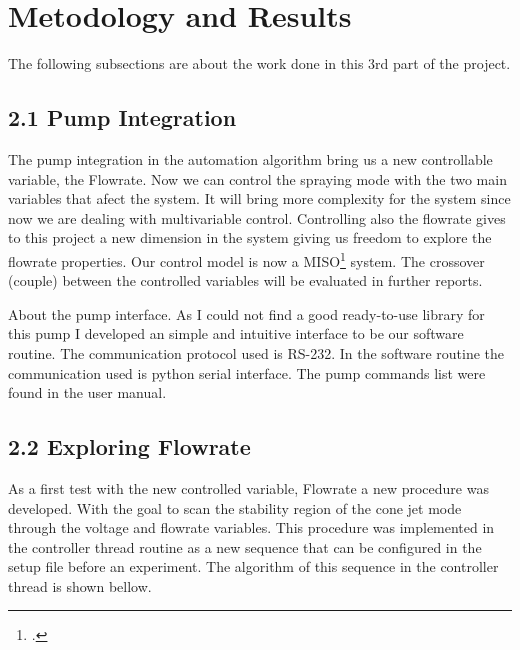 \section{Metodology and Results}

    The following subsections are about the work done in this 3rd part of the project.


\subsection*{2.1 Pump Integration}

    The pump integration in the automation algorithm bring us a new controllable variable, the Flowrate. Now we can control the spraying mode with the
    two main variables that afect the system. 
    It will bring more complexity for the system since now we are dealing with multivariable control.
    Controlling also the flowrate gives to this project a new dimension in the system giving us freedom to explore the flowrate properties.
    Our control model is now a MISO\footcite{MISO: Multiple Inputs Single Output} system. The crossover (couple) between the controlled variables will be evaluated in further reports.

    About the pump interface. As I could not find a good ready-to-use library for this pump I developed an simple and intuitive interface to be our software routine.
    The communication protocol used is RS-232. In the software routine the communication used is python serial interface. The pump commands list were found in the user manual.


\subsection*{2.2 Exploring Flowrate}

    As a first test with the new controlled variable, Flowrate a new procedure was developed. With the goal to scan the stability region of the cone jet mode through the voltage and flowrate variables.
    This procedure was implemented in the controller thread routine as a new sequence that can be configured in the setup file before an experiment.
    The algorithm of this sequence in the controller thread is shown bellow.


